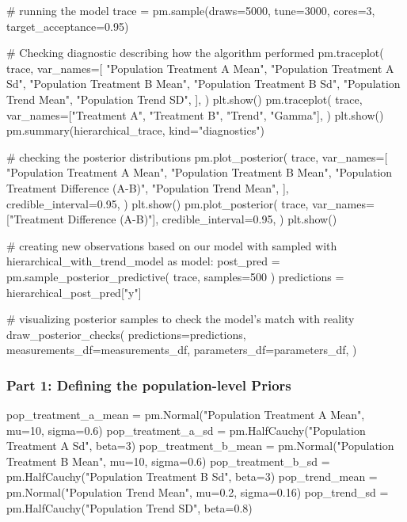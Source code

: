 \documentclass[12pt,a4paper,leqno]{report}
\theoremstyle{plain}
\theoremstyle{definition}
\theoremstyle{remark}
\begin{document}
\begin{pyverbatim}[][fontsize=\footnotesize]
    # running the model
    trace = pm.sample(draws=5000, tune=3000, cores=3, target_acceptance=0.95)

    # Checking diagnostic describing how the algorithm performed
    pm.traceplot(
        trace,
        var_names=[
            "Population Treatment A Mean",
            "Population Treatment A Sd",
            "Population Treatment B Mean",
            "Population Treatment B Sd",
            "Population Trend Mean",
            "Population Trend SD",
        ],
    )
    plt.show()
    pm.traceplot(
        trace,
        var_names=["Treatment A", "Treatment B", "Trend", "Gamma"],
    )
    plt.show()
    pm.summary(hierarchical_trace, kind="diagnostics")

    # checking the posterior distributions
    pm.plot_posterior(
        trace,
        var_names=[
            "Population Treatment A Mean",
            "Population Treatment B Mean",
            "Population Treatment Difference (A-B)",
            "Population Trend Mean",
        ],
        credible_interval=0.95,
    )
    plt.show()
    pm.plot_posterior(
        trace,
        var_names=["Treatment Difference (A-B)"],
        credible_interval=0.95,
    )
    plt.show()

# creating new observations based on our model with sampled
with hierarchical_with_trend_model as model:
    post_pred = pm.sample_posterior_predictive(
        trace, samples=500
    )
    predictions = hierarchical_post_pred["y"]

# visualizing posterior samples to check the model's match with reality
draw_posterior_checks(
    predictions=predictions,
    measurements_df=measurements_df,
    parameters_df=parameters_df,
)
\end{pyverbatim}
\bigskip

\subsubsection*{Part 1: Defining the population-level Priors}

\bigskip
\begin{pyverbatim}[][fontsize=\footnotesize]
    pop_treatment_a_mean = pm.Normal("Population Treatment A Mean", mu=10, sigma=0.6)
    pop_treatment_a_sd = pm.HalfCauchy("Population Treatment A Sd", beta=3)
    pop_treatment_b_mean = pm.Normal("Population Treatment B Mean", mu=10, sigma=0.6)
    pop_treatment_b_sd = pm.HalfCauchy("Population Treatment B Sd", beta=3)
    pop_trend_mean = pm.Normal("Population Trend Mean", mu=0.2, sigma=0.16)
    pop_trend_sd = pm.HalfCauchy("Population Trend SD", beta=0.8)
\end{pyverbatim}
\bigskip
\end{document}
